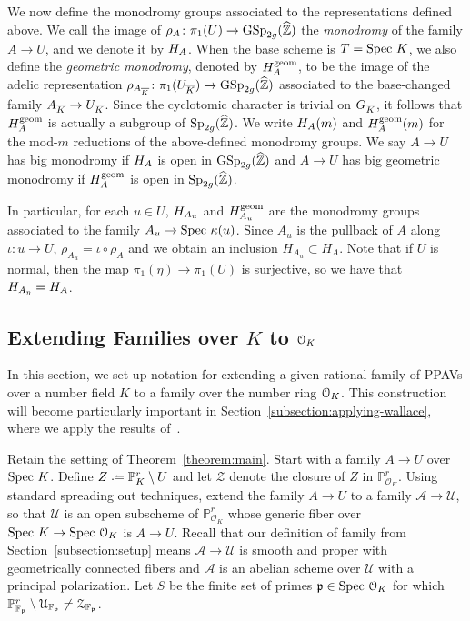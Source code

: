 We now define the monodromy groups associated to the representations defined above. We call the image of $\rho_A \colon \pi_1(U) \to \operatorname{GSp}_{2g}(\widehat{\mathbb Z})$ the {\it monodromy} of the family $A \to U$, and we denote it by $H_A$. When the base scheme is $T = \text{Spec } K$, we also define the {\it geometric monodromy}, denoted by $H_A^{\operatorname{geom}}$, to be the image of the adelic representation $\rho_{A_{\overline K}}\colon \pi_1(U_{\overline K}) \rightarrow \operatorname{GSp}_{2g}(\widehat{\mathbb Z})$ associated to the base-changed family $A_{\overline{K}} \to U_{\overline{K}}$.
Since the cyclotomic character is trivial on $G_{\overline{K}}$, it follows that $H_A^{\operatorname{geom}}$ is actually a subgroup of $\operatorname{Sp}_{2g}(\widehat{\mathbb Z})$. We write $H_A(m)$ and $H_A^{\operatorname{geom}}(m)$ for the mod-$m$ reductions of the above-defined monodromy groups.
We say $A \rightarrow U$ has big monodromy if $H_A$ is open
in $\operatorname{GSp}_{2g}(\widehat{{\mathbb Z}})$ and $A \rightarrow U$ has big geometric monodromy if
$H_A^{\operatorname{geom}}$ is open in $\operatorname{Sp}_{2g}(\widehat{{\mathbb Z}})$.


In particular, for each $u \in U$, $H_{A_u}$ and $H_{A_u}^{\operatorname{geom}}$ are the monodromy groups associated to the family $A_u \to \text{Spec } \kappa(u)$. Since $A_u$ is the pullback of $A$ along $\iota: u \rightarrow U$, $\rho_{A_u} = \iota \circ \rho_A$ and we obtain an inclusion $H_{A_u} \subset H_A$. Note that if $U$ is normal, then the map $\pi_1(\eta) \rightarrow \pi_1(U)$ is surjective, so we have that $H_{A_\eta} = H_A$.

\subsection{Extending Families over $K$ to $\mathcal O_K$}
\label{subsection:notation-for-families}
In this section, we set up notation for extending a given rational family of PPAVs over a number field $K$ to a family over the number ring $\mathcal O_K$.
This construction will become particularly important in Section~\ref{subsection:applying-wallace}, where we apply the results of~\cite{scoopdedoo}.

Retain the setting of Theorem~\ref{theorem:main}.
Start with a family $A \rightarrow U$ over $\text{Spec } K$.
Define $Z \defeq \mathbb P_K^r \setminus U$
and let $\mathcal Z$ denote the closure of $Z$ in $\mathbb P^r_{\mathcal O_K}$.
Using standard spreading out techniques,
extend the family $A \rightarrow U$ to a family $\mathcal A \rightarrow \mathcal U$, so that $\mathcal U$ is an open subscheme of $\mathbb P^r_{\mathcal O_K}$
whose generic fiber over $\text{Spec } K \rightarrow \text{Spec } \mathcal O_K$
is $A \rightarrow U$.
Recall that our definition of family from Section~\ref{subsection:setup} means
$\mathcal A \rightarrow \mathcal U$ is smooth and proper with geometrically connected fibers and $\mathcal A$ is an abelian scheme over $\mathcal U$ with a principal polarization.
Let $S$ be the finite set of primes ${\mathfrak p} \in \text{Spec } \mathcal O_K$
for which $\mathbb P^r_{\mathbb F_\mathfrak p} \setminus \mathcal U_{\mathbb F_\mathfrak p} \neq \mathcal Z_{\mathbb F_\mathfrak p}$.

